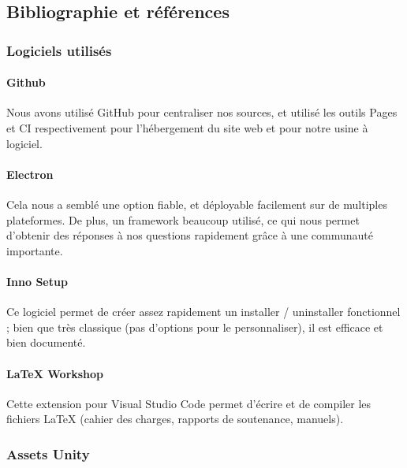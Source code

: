 \subsection{Bibliographie et références}

    \vspace{0.5cm}
    \subsubsection{Logiciels utilisés}
    \vspace{0.5cm}

    
        \paragraph{Github} Nous avons utilisé GitHub pour centraliser nos sources, et utilisé les outils Pages et CI respectivement 
        pour l'hébergement du site web et pour notre usine à logiciel.

        \paragraph{Electron} Cela nous a semblé une option fiable, et déployable facilement sur de multiples plateformes. De plus, 
        un framework beaucoup utilisé, ce qui nous permet d'obtenir des réponses à nos questions rapidement grâce à une communauté importante.

        \paragraph{Inno Setup} Ce logiciel permet de créer assez rapidement un installer / uninstaller fonctionnel ; bien que très classique 
        (pas d'options pour le personnaliser), il est efficace et bien documenté.

        \paragraph{LaTeX Workshop} Cette extension pour Visual Studio Code permet d'écrire et de compiler les fichiers LaTeX (cahier des charges, 
        rapports de soutenance, manuels).

    \vspace{0.5cm}
    \subsubsection{Assets Unity}
    \vspace{0.5cm}


